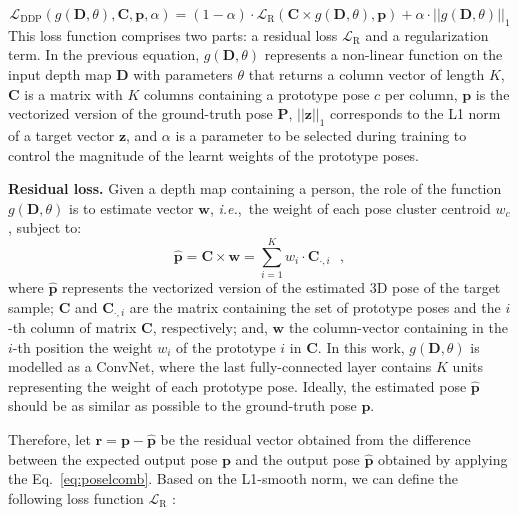 \documentclass[review,12pt,3p]{elsarticle}
\def \ie{\textit{i.e.}}
\newcommand{\myparagraph}[1]{\noindent \textbf{#1}}
\begin{document}
\begin{equation} \label{eq:mtLoss}
    \mathcal{L}_{\text{DDP}}\left( g(\mathbf{D}, \theta), \mathbf{C}, \mathbf{p}, \alpha \right) =
    (1-\alpha) \cdot \mathcal{L}_{\text{R}} \left( \mathbf{C} \times g(\mathbf{D}, \theta) , \mathbf{p} \right)
    + \alpha \cdot ||g(\mathbf{D}, \theta)||_1 
\end{equation}
This loss function comprises two parts: a residual loss $\mathcal{L}_{\text{R}}$ and a regularization term.
In the previous equation, $g(\mathbf{D}, \theta)$  represents a non-linear function on the input depth map $\mathbf{D}$ with parameters $\theta$ that returns a column vector of length $K$, $\mathbf{C}$ is a matrix with $K$ columns containing a prototype pose $c$ per column, $\mathbf{p}$ is the vectorized version of the ground-truth pose $\mathbf{P}$, $||\mathbf{z}||_1$ corresponds to the L1 norm of a target vector $\mathbf{z}$, and $\alpha$ is a  parameter to be selected during training to control the magnitude of the learnt weights of the prototype poses.

\myparagraph{Residual loss.}
Given a depth map containing a person, the role of the function $g(\mathbf{D}, \theta)$ is to estimate vector $\mathbf{w}$, \ie,~the weight of each pose cluster centroid $w_c$, subject to:
\begin{equation}\label{eq:poselcomb}
    \hat{\mathbf{p}} = \mathbf{C} \times \mathbf{w} = \sum_{i=1}^K w_i \cdot \mathbf{C}_{\cdot,i} \textrm{ },
\end{equation}
where $\hat{\mathbf{p}}$ represents the vectorized version of the estimated 3D pose of the target sample; $\mathbf{C}$ and $\mathbf{C}_{\cdot,i}$ are the matrix containing the set of prototype poses and the $i$-th column of matrix $\mathbf{C}$, respectively; and, $\mathbf{w}$ the column-vector containing in the $i$-th position the weight $w_i$  of the prototype $i$ in $\mathbf{C}$. 
In this work, $g(\mathbf{D}, \theta)$ is modelled as a ConvNet, where the last fully-connected layer contains $K$ units representing the weight of each prototype pose. Ideally, the estimated pose $\hat{\mathbf{p}}$ should be as similar as possible to the ground-truth pose $\mathbf{p}$.

Therefore, let $\mathbf{r}= \mathbf{p} - \hat{\mathbf{p}}$ be the residual vector obtained from the difference between the expected output pose $\mathbf{p}$ and the output pose $\hat{\mathbf{p}}$ obtained by applying the Eq.~\ref{eq:poselcomb}. 
Based on the L1-smooth norm, we can define the following loss function $\mathcal{L}_{\text{R}}$ :
\end{document}
